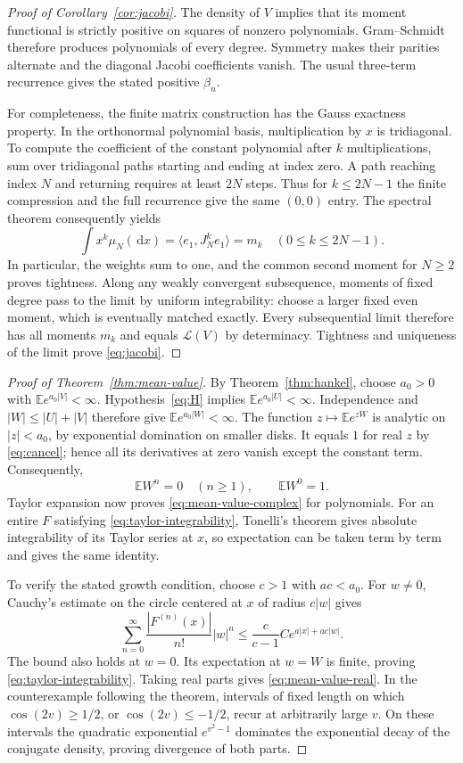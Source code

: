 \documentclass[11pt,twoside]{article}
\theoremstyle{journalplain}
\numberwithin{equation}{section}
\theoremstyle{journaldefinition}
\newcommand{\E}{\mathbb E}
\newcommand{\dd}{\,\mathrm d}
\newcommand{\Law}{\mathcal L}
\begin{document}
\begin{proof}[Proof of Corollary~\ref{cor:jacobi}]
The density of $V$ implies that its moment functional is strictly positive on squares of nonzero polynomials. Gram--Schmidt therefore produces polynomials of every degree. Symmetry makes their parities alternate and the diagonal Jacobi coefficients vanish. The usual three-term recurrence gives the stated positive $\beta_n$.

For completeness, the finite matrix construction has the Gauss exactness property. In the orthonormal polynomial basis, multiplication by $x$ is tridiagonal. To compute the coefficient of the constant polynomial after $k$ multiplications, sum over tridiagonal paths starting and ending at index zero. A path reaching index $N$ and returning requires at least $2N$ steps. Thus for $k\le2N-1$ the finite compression and the full recurrence give the same $(0,0)$ entry. The spectral theorem consequently yields
\[
 \int x^k\mu_N(\dd x)=\langle e_1,J_N^ke_1\rangle=m_k
 \quad(0\le k\le2N-1).
\]
In particular, the weights sum to one, and the common second moment for $N\ge2$ proves tightness. Along any weakly convergent subsequence, moments of fixed degree pass to the limit by uniform integrability: choose a larger fixed even moment, which is eventually matched exactly. Every subsequential limit therefore has all moments $m_k$ and equals $\Law(V)$ by determinacy. Tightness and uniqueness of the limit prove \eqref{eq:jacobi}.
\end{proof}

\begin{proof}[Proof of Theorem~\ref{thm:mean-value}]
By Theorem~\ref{thm:hankel}, choose $a_0>0$ with $\E e^{a_0|V|}<\infty$. Hypothesis~\eqref{eq:H} implies $\E e^{a_0|U|}<\infty$. Independence and $|W|\le |U|+|V|$ therefore give $\E e^{a_0|W|}<\infty$. The function $z\mapsto\E e^{zW}$ is analytic on $|z|<a_0$, by exponential domination on smaller disks. It equals $1$ for real $z$ by \eqref{eq:cancel}; hence all its derivatives at zero vanish except the constant term. Consequently,
\[
 \E W^n=0\quad(n\ge1),\qquad \E W^0=1.
\]
Taylor expansion now proves \eqref{eq:mean-value-complex} for polynomials. For an entire $F$ satisfying \eqref{eq:taylor-integrability}, Tonelli's theorem gives absolute integrability of its Taylor series at $x$, so expectation can be taken term by term and gives the same identity.

To verify the stated growth condition, choose $c>1$ with $ac<a_0$. For $w\ne0$, Cauchy's estimate on the circle centered at $x$ of radius $c|w|$ gives
\[
 \sum_{n=0}^{\infty}\frac{|F^{(n)}(x)|}{n!}|w|^n
 \le \frac{c}{c-1}C e^{a|x|+ac|w|}.
\]
The bound also holds at $w=0$. Its expectation at $w=W$ is finite, proving \eqref{eq:taylor-integrability}. Taking real parts gives \eqref{eq:mean-value-real}. In the counterexample following the theorem, intervals of fixed length on which $\cos(2v)\ge1/2$, or $\cos(2v)\le-1/2$, recur at arbitrarily large $v$. On these intervals the quadratic exponential $e^{v^2-1}$ dominates the exponential decay of the conjugate density, proving divergence of both parts.
\end{proof}
\end{document}
